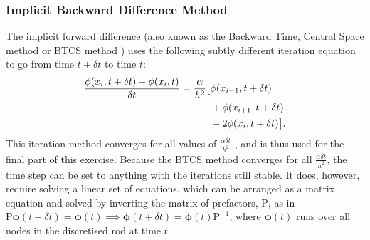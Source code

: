 \subsubsection{Implicit Backward Difference Method}
\label{subsubsec:implicit}

The implicit forward difference (also known as the Backward Time, Central Space method or BTCS method \cite{laney1998}) uses the following subtly different iteration equation to go from time $t+\delta t$ to time $t$:
\begin{align}
    \frac{\phi(x_i,t+\delta t) - \phi(x_i,t)}{\delta t} = \frac{\alpha}{h^2}\big[&\phi(x_{i-1},t+\delta t) \notag \\
                                                                                 & + \phi(x_{i+1},t+\delta t) \label{eqn:implicit} \\
                                                                                 & - 2\phi(x_i,t+\delta t)\big]. \notag
\end{align}
This iteration method converges for all values of $\frac{\alpha \delta t}{h^2}$ \cite{hoffman2001}, and is thus used for the final part of this exercise. Because the BTCS method converges for all $\frac{\alpha \delta t}{h^2}$, the time step can be set to anything with the iterations still stable. It does, however, require solving a linear set of equations, which can be arranged as a matrix equation and solved by inverting the matrix of prefactors, $\text{P}$, as in $\text{P}\bm{\phi}(t+\delta t) = \bm{\phi}(t) \implies \bm{\phi}(t+\delta t) = \bm{\phi}(t) \text{P}^{-1}$, where $\bm{\phi}(t)$ runs over all nodes in the discretised rod at time $t$.